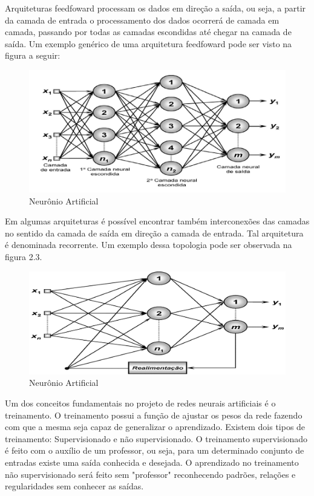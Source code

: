 Arquiteturas feedfoward processam os dados em direção a saída, ou seja, a partir da camada de entrada o processamento dos dados ocorrerá de camada em camada, passando por todas as camadas escondidas até chegar na camada de saída. Um exemplo genérico de uma arquitetura feedfoward pode ser visto na figura a seguir:
\begin{figure}[h]
	\centering
    \label{fig1}
    \vspace{3ex}%
	\includegraphics[scale=0.4]{pasta1_figuras/rna-Feedfoward.png}
    \caption{Neurônio Artificial}
\end{figure}

Em algumas arquiteturas é possível encontrar também interconexões das camadas no sentido da camada de saída em direção a camada de entrada. Tal arquitetura é denominada recorrente. Um exemplo dessa topologia pode ser observada na figura 2.3.
\begin{figure}[h]
	\centering
    \label{fig1}
    \vspace{3ex}%
	\includegraphics[scale=0.35]{pasta1_figuras/redes-recorrentes.png}
    \caption{Neurônio Artificial}
\end{figure}

Um dos conceitos fundamentais no projeto de redes neurais artificiais é o treinamento. O treinamento possui a função de ajustar os pesos da rede fazendo com que a mesma seja capaz de generalizar o aprendizado. Existem dois tipos de treinamento: Supervisionado e não supervisionado. O treinamento supervisionado é feito com o auxílio de um professor, ou seja, para um determinado conjunto de entradas existe uma saída conhecida e desejada. O aprendizado no treinamento não supervisionado será feito sem "professor" reconhecendo padrões, relações e regularidades sem conhecer as saídas.


